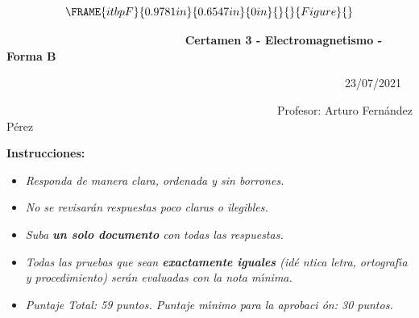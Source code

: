 \documentclass{article}
\begin{document}
\ 
\begin{equation*}
\FRAME{itbpF}{0.9781in}{0.6547in}{0in}{}{}{Figure}{\special{language
"Scientific Word";type "GRAPHIC";maintain-aspect-ratio TRUE;display
"USEDEF";valid_file "T";width 0.9781in;height 0.6547in;depth
0in;original-width 1.1044in;original-height 0.729in;cropleft "0";croptop
"1";cropright "1";cropbottom "0";tempfilename
'QWLOE201.wmf';tempfile-properties "XPR";}}
\end{equation*}

\ \ \ \ \ \ \ \ \ \ \ \ \ \ \ \ \ \ \ \ \ \ \ \ \ \ \ \ \ \ \ \textbf{%
Certamen 3 - Electromagnetismo - Forma B}

\ \ \ \ \ \ \ \ \ \ \ \ \ \ \ \ \ \ \ \ \ \ \ \ \ \ \ \ \ \ \ \ \ \ \ \ \ \
\ \ \ \ \ \ \ \ \ \ \ \ \ \ \ \ \ \ \ \ \ \ 23/07/2021

\noindent\ \ \ \ \ \ \ \ \ \ \ \ \ \ \ \ \ \ \ \ \ \ \ \ \ \ \ \ \ \ \ \ \ \
\ \ \ \ \ \ \ \ \ \ \ \ \ \ Profesor: Arturo Fern\'{a}ndez P\'{e}rez 

\bigskip

\textbf{Instrucciones: }

\begin{itemize}
\item \emph{Responda de manera clara, ordenada y sin borrones. }

\item \emph{No se revisar\'{a}n respuestas poco claras o ilegibles. }

\item \emph{Suba \textbf{un solo documento} con todas las respuestas. }

\item \emph{Todas las pruebas que sean \textbf{exactamente iguales} (id\'{e}%
ntica letra, ortograf\'{\i}a y procedimiento) ser\'{a}n evaluadas con la
nota m\'{\i}nima.}

\item \emph{Puntaje Total: 59 puntos. Puntaje m\'{\i}nimo para la aprobaci%
\'{o}n: 30 puntos.}
\end{itemize}

\bigskip
\end{document}
